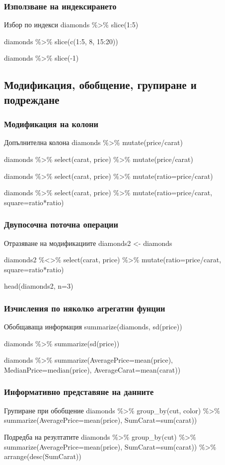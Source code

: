 \documentclass{beamer}
\begin{document}
\begin{frame}
\frametitle{Използване на индексирането}
\begin{block}{Избор по индекси}
diamonds \%>\% slice(1:5)

diamonds \%>\% slice(c(1:5, 8, 15:20))

diamonds \%>\% slice(-1)
\end{block}
\end{frame}

\subsection{Модификация, обобщение, групиране и подреждане}

\begin{frame}
\frametitle{Модификация на колони}
\begin{block}{Допълнителна колона}
diamonds \%>\% mutate(price/carat)

diamonds \%>\% select(carat, price) \%>\% mutate(price/carat)

diamonds \%>\% select(carat, price) \%>\% mutate(ratio=price/carat)

diamonds \%>\% select(carat, price) \%>\% mutate(ratio=price/carat, square=ratio*ratio)
\end{block}
\end{frame}

\begin{frame}
\frametitle{Двупосочна поточна операции}
\begin{block}{Отразяване на модификациите}
diamonds2 <- diamonds

diamonds2 \%<>\% select(carat, price) \%>\% mutate(ratio=price/carat, square=ratio*ratio)

head(diamonds2, n=3)
\end{block}
\end{frame}

\begin{frame}
\frametitle{Изчисления по няколко агрегатни фунции}
\begin{block}{Обобщаваща информация}
summarize(diamonds, sd(price))

diamonds \%>\% summarize(sd(price))

diamonds \%>\% summarize(AveragePrice=mean(price), MedianPrice=median(price), AverageCarat=mean(carat))
\end{block}
\end{frame}

\begin{frame}
\frametitle{Информативно представяне на данните}
\begin{block}{Групиране при обобщение}
diamonds \%>\% group\_by(cut, color) \%>\% summarize(AveragePrice=mean(price), SumCarat=sum(carat))
\end{block}

\begin{block}{Подредба на резултатите}
diamonds \%>\% group\_by(cut) \%>\% summarize(AveragePrice=mean(price), SumCarat=sum(carat)) \%>\% arrange(desc(SumCarat))
\end{block}
\end{frame}
\end{document}
